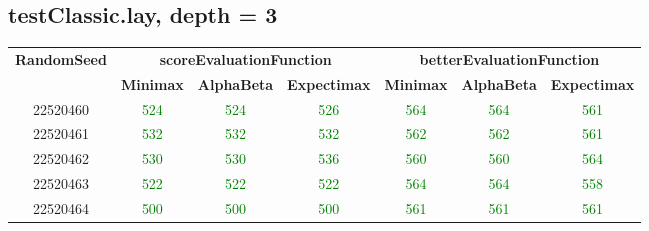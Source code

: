 \documentclass[english, a4paper,12pt]{article}
\begin{document}
\subsection*{testClassic.lay, depth = 3}
\small\begin{tabular}{|c|c|c|c|c|c|c|}
\hline
\textbf{RandomSeed} & \multicolumn{3}{c|}{\textbf{scoreEvaluationFunction}} & \multicolumn{3}{c|}{\textbf{betterEvaluationFunction}} \\
\cline{2-7}
& \textbf{Minimax} & \textbf{AlphaBeta} & \textbf{Expectimax} & \textbf{Minimax} & \textbf{AlphaBeta} & \textbf{Expectimax} \\
\hline
22520460 & \textcolor{Green}{524} & \textcolor{Green}{524} & \textcolor{Green}{526} & \textcolor{Green}{564} & \textcolor{Green}{564} & \textcolor{Green}{561} \\
22520461 & \textcolor{Green}{532} & \textcolor{Green}{532} & \textcolor{Green}{532} & \textcolor{Green}{562} & \textcolor{Green}{562} & \textcolor{Green}{561} \\
22520462 & \textcolor{Green}{530} & \textcolor{Green}{530} & \textcolor{Green}{536} & \textcolor{Green}{560} & \textcolor{Green}{560} & \textcolor{Green}{564} \\
22520463 & \textcolor{Green}{522} & \textcolor{Green}{522} & \textcolor{Green}{522} & \textcolor{Green}{564} & \textcolor{Green}{564} & \textcolor{Green}{558} \\
22520464 & \textcolor{Green}{500} & \textcolor{Green}{500} & \textcolor{Green}{500} & \textcolor{Green}{561} & \textcolor{Green}{561} & \textcolor{Green}{561} \\
\hline
\end{tabular}
\end{document}
